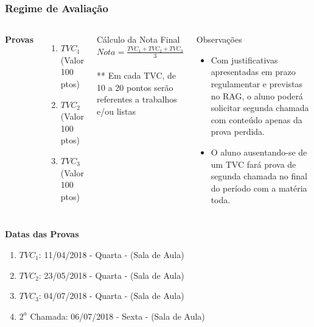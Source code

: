 \documentclass{beamer}
\begin{document}
\begin{frame}
\frametitle{Regime de Avaliação}
\begin{columns}[c] %

\textbf{Provas}
\begin{enumerate}
\item $TVC_1$ (Valor 100 ptos)
\item $TVC_2$ (Valor 100 ptos)
\item $TVC_3$ (Valor 100 ptos)
\end{enumerate} 

\begin{block}{Cálculo da Nota Final}
$Nota = \frac{TVC_1+TVC_2+TVC_3}{3}$ \\~\\

** Em cada TVC, de 10 a 20 pontos serão referentes a trabalhos e/ou listas

\end{block}


\begin{block}{Observações}
\begin{itemize}

\item Com justificativas apresentadas em prazo regulamentar e previstas no RAG, o aluno poderá solicitar segunda chamada com conteúdo apenas da prova perdida.
\item O aluno ausentando-se de um TVC fará prova de segunda chamada no final do período com a matéria toda.
\end{itemize}
\end{block}

\end{columns}

\end{frame}

\begin{frame}
	\textbf{Datas das Provas}
	\begin{enumerate}
		\item $TVC_1$: 11/04/2018 - Quarta - (Sala de Aula)
		\item $TVC_2$: 23/05/2018 - Quarta - (Sala de Aula)
		\item $TVC_3$: 04/07/2018 - Quarta - (Sala de Aula)
		\item $2^a$ Chamada: 06/07/2018 - Sexta - (Sala de Aula)
	\end{enumerate}
\end{frame}
\end{document}
